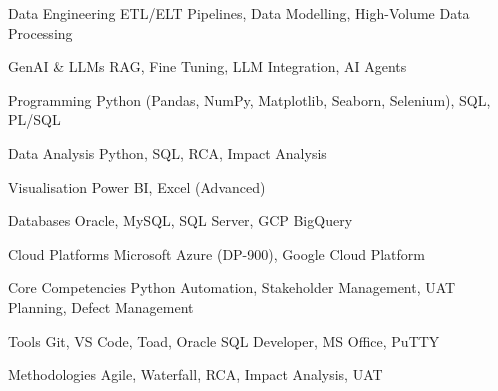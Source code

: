 
\begin{minipage}[t]{\dimexpr(\linewidth/2) - 0.5em}
  \vspace{-0.8em}
  \begin{cvskills}

    \cvskill
      {Data Engineering}
      {ETL/ELT Pipelines, Data Modelling, High-Volume Data Processing}

    \cvskill
      {GenAI \& LLMs}
      {RAG, Fine Tuning, LLM Integration, AI Agents}

    \cvskill
      {Programming}
      {Python (Pandas, NumPy, Matplotlib, Seaborn, Selenium), SQL, PL/SQL}

    \cvskill
      {Data Analysis}
      {Python, SQL, RCA, Impact Analysis}

    \cvskill
      {Visualisation}
      {Power BI, Excel (Advanced)}

  \end{cvskills}
\end{minipage}
\hfill
\begin{minipage}[t]{\dimexpr(\linewidth/2) - 0.5em}
  \vspace{-0.8em}
  \begin{cvskills}

    \cvskill
      {Databases}
      {Oracle, MySQL, SQL Server, GCP BigQuery}

    \cvskill
      {Cloud Platforms}
      {Microsoft Azure (DP-900), Google Cloud Platform}

    \cvskill
      {Core Competencies}
      {Python Automation, Stakeholder Management, UAT Planning, Defect Management}

    \cvskill
      {Tools}
      {Git, VS Code, Toad, Oracle SQL Developer, MS Office, PuTTY}

    \cvskill
      {Methodologies}
      {Agile, Waterfall, RCA, Impact Analysis, UAT}

  \end{cvskills}
\end{minipage}
